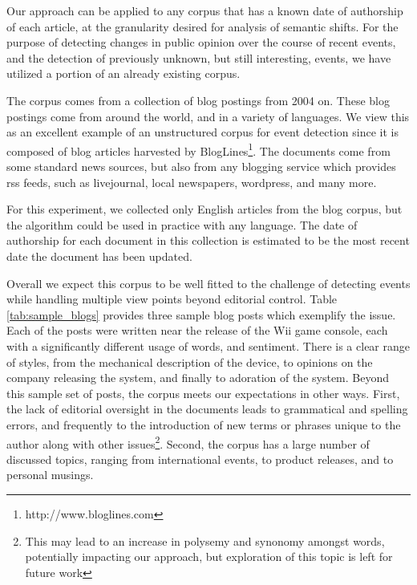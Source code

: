 \documentclass[a4paper,twocolumn,twoside,10pt]{ranlp}
\begin{document}
Our approach can be applied to any corpus that has a known date of authorship
of each article, at the granularity desired for analysis of semantic shifts.
For the purpose of detecting changes in public opinion over the course of recent
events, and the detection of previously unknown, but still interesting, events,
we have utilized a portion of an already existing corpus\cite{sia08efficient}.

The corpus comes from a collection of blog postings from 2004 on.  These blog
postings come from around the world, and in a variety of languages.  We view
this as an excellent example of an unstructured corpus for event detection since
it is composed of blog articles harvested by
BlogLines\footnote{http://www.bloglines.com}.  The documents come from some
standard news sources, but also from any blogging service which provides rss
feeds, such as livejournal, local newspapers, wordpress, and many more.

For this experiment, we collected only English articles from the blog corpus,
but the algorithm could be used in practice with any language.  The date of
authorship for each document in this collection is estimated to be the most
recent date the document has been updated.

Overall we expect this corpus to be well fitted to the challenge of detecting
events while handling multiple view points beyond editorial control.  Table
\ref{tab:sample_blogs} provides three sample blog posts which exemplify the
issue.  Each of the posts were written near the release of the Wii game console,
each with a significantly different usage of words, and sentiment.  There is a
clear range of styles, from the mechanical description of the device, to
opinions on the company releasing the system, and finally to adoration of the
system. Beyond this sample set of posts, the corpus meets our expectations in
other ways.  First, the lack of editorial oversight in the documents leads to
grammatical and spelling errors, and frequently to the introduction of new terms
or phrases unique to the author along with other issues\footnote{This may lead
to an increase in polysemy and synonomy amongst words, potentially impacting our
approach, but exploration of this topic is left for future work}.   Second, the
corpus has a large number of discussed topics, ranging from international
events, to product releases, and to personal musings.
\end{document}
